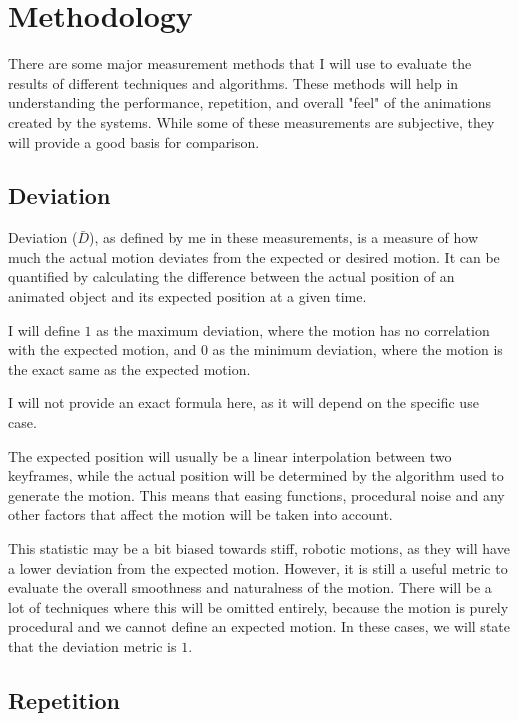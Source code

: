 \pagebreak

\section{Methodology}
\label{sec:methodology}

There are some major measurement methods that I will use to evaluate the results of different techniques and algorithms. These methods will help in understanding the performance, repetition, and overall "feel" of the animations created by the systems. While some of these measurements are subjective, they will provide a good basis for comparison.

\subsection{Deviation}
\label{subsec:deviation}

Deviation (\(\bar{D}\)), as defined by me in these measurements, is a measure of how much the actual motion deviates from the expected or desired motion. It can be quantified by calculating the difference between the actual position of an animated object and its expected position at a given time. 

I will define \(1\) as the maximum deviation, where the motion has no correlation with the expected motion, and \(0\) as the minimum deviation, where the motion is the exact same as the expected motion.

I will not provide an exact formula here, as it will depend on the specific use case.

The expected position will usually be a linear interpolation between two keyframes, while the actual position will be determined by the algorithm used to generate the motion. This means that easing functions, procedural noise and any other factors that affect the motion will be taken into account.

This statistic may be a bit biased towards stiff, robotic motions, as they will have a lower deviation from the expected motion. However, it is still a useful metric to evaluate the overall smoothness and naturalness of the motion. There will be a lot of techniques where this will be omitted entirely, because the motion is purely procedural and we cannot define an expected motion. In these cases, we will state that the deviation metric is \(1\).

\subsection{Repetition}
\label{subsec:repetition}

